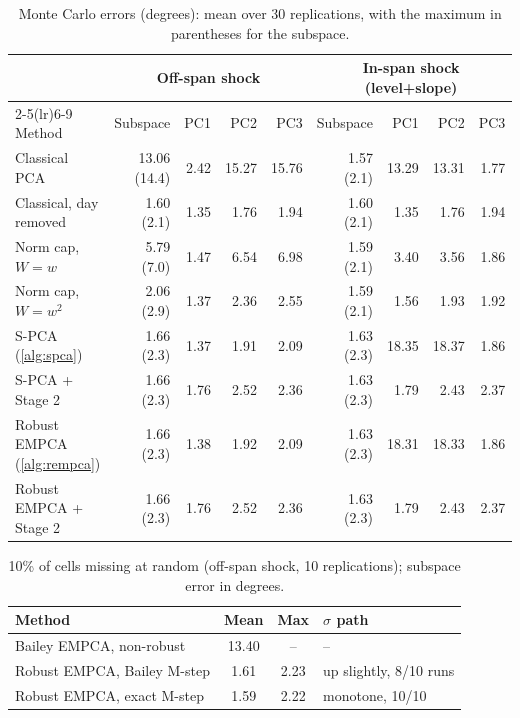 \documentclass[11pt]{article}
\theoremstyle{definition}
\theoremstyle{remark}
\begin{document}
\begin{table}[ht]\centering
\caption{Monte Carlo errors (degrees): mean over 30 replications, with the maximum in parentheses for the subspace.}\label{tab:mc}
\footnotesize\setlength{\tabcolsep}{4pt}
\begin{tabular}{lrrrr@{\quad}rrrr}\toprule
& \multicolumn{4}{c}{Off-span shock} & \multicolumn{4}{c}{In-span shock (level+slope)}\\
\cmidrule(lr){2-5}\cmidrule(lr){6-9}
Method & Subspace & PC1 & PC2 & PC3 & Subspace & PC1 & PC2 & PC3\\\midrule
Classical PCA & 13.06 (14.4) & 2.42 & 15.27 & 15.76 & 1.57 (2.1) & 13.29 & 13.31 & 1.77\\
Classical, day removed & 1.60 (2.1) & 1.35 & 1.76 & 1.94 & 1.60 (2.1) & 1.35 & 1.76 & 1.94\\
Norm cap, $W=w$ & 5.79 (7.0) & 1.47 & 6.54 & 6.98 & 1.59 (2.1) & 3.40 & 3.56 & 1.86\\
Norm cap, $W=w^2$ & 2.06 (2.9) & 1.37 & 2.36 & 2.55 & 1.59 (2.1) & 1.56 & 1.93 & 1.92\\
S-PCA (\cref{alg:spca}) & 1.66 (2.3) & 1.37 & 1.91 & 2.09 & 1.63 (2.3) & 18.35 & 18.37 & 1.86\\
S-PCA + Stage 2 & 1.66 (2.3) & 1.76 & 2.52 & 2.36 & 1.63 (2.3) & 1.79 & 2.43 & 2.37\\
Robust EMPCA (\cref{alg:rempca}) & 1.66 (2.3) & 1.38 & 1.92 & 2.09 & 1.63 (2.3) & 18.31 & 18.33 & 1.86\\
Robust EMPCA + Stage 2 & 1.66 (2.3) & 1.76 & 2.52 & 2.36 & 1.63 (2.3) & 1.79 & 2.43 & 2.37\\\bottomrule
\end{tabular}
\end{table}

\begin{table}[ht]\centering
\caption{10\% of cells missing at random (off-span shock, 10 replications); subspace error in degrees.}\label{tab:missing}
\begin{tabular}{lccl}\toprule
Method & Mean & Max & $\sigma$ path\\\midrule
Bailey EMPCA, non-robust & 13.40 & -- & --\\
Robust EMPCA, Bailey M-step & 1.61 & 2.23 & up slightly, 8/10 runs\\
Robust EMPCA, exact M-step & 1.59 & 2.22 & monotone, 10/10\\\bottomrule
\end{tabular}
\end{table}
\end{document}
